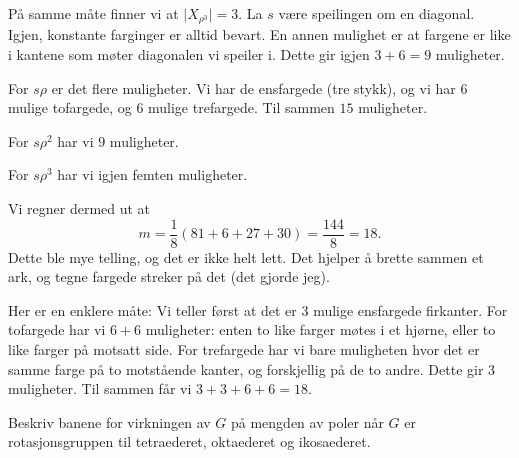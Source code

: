 \documentclass[11pt, norsk]{article}
\begin{document}
\begin{losn}
\begin{enumerate}[a)]
På samme måte finner vi at $\lvert X_{\rho^3} \rvert = 3$. La $s$ være speilingen om en diagonal. Igjen, konstante farginger er alltid bevart. En annen mulighet er at fargene er like i kantene som møter diagonalen vi speiler i. Dette gir igjen $3+6=9$ muligheter.

For $s\rho$ er det flere muligheter. Vi har de ensfargede (tre stykk), og vi har $6$ mulige tofargede, og $6$ mulige trefargede. Til sammen $15$ muligheter.

For $s\rho^2$ har vi $9$ muligheter.

For $s \rho^3$ har vi igjen femten muligheter.

Vi regner dermed ut at 
\[
m = \frac{1}{8} \left( 81+6 + 27+30\right) = \frac{144}{8} = 18.
\]
Dette ble mye telling, og det er ikke helt lett. Det hjelper å brette sammen et ark, og tegne fargede streker på det (det gjorde jeg).

Her er en enklere måte: Vi teller først at det er $3$ mulige ensfargede firkanter. For tofargede har vi $6+6$ muligheter: enten to like farger møtes i et hjørne, eller to like farger på motsatt side. For trefargede har vi bare muligheten hvor det er samme farge på to motstående kanter, og forskjellig på de to andre. Dette gir $3$ muligheter. Til sammen får vi $3+3+6+6=18$. 
  \end{enumerate}
\end{losn}

\begin{oppg}
Beskriv banene for virkningen av $G$ på mengden av poler når $G$ er rotasjonsgruppen til tetraederet, oktaederet og ikosaederet.
\end{oppg}
\end{document}
